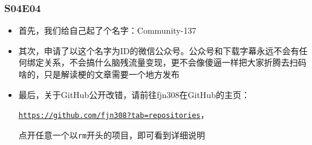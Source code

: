 \documentclass{ctexart}
\begin{document}
\subsubsection{S04E04}\label{gh}

\begin{itemize}
    \item 首先，我们给自己起了个名字：Community-137
    \item 其次，申请了以这个名字为ID的微信公众号。公众号和下载字幕永远不会有任何绑定关系，不会搞什么脑残流量变现，更不会像傻逼一样把大家折腾去扫码啥的，只是解读梗的文章需要一个地方发布
    \item 最后，关于GitHub公开改错，请前往fjn308在GitHub的主页： 
    
    \href{https://github.com/fjn308?tab=repositories}{\texttt{https://github.com/fjn308?tab=repositories}}，
    
    点开任意一个以\texttt{rm}开头的项目，即可看到详细说明
\end{itemize}
\end{document}
